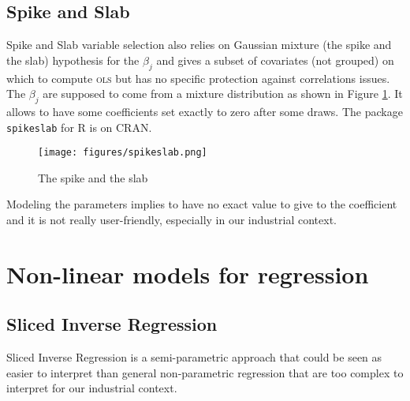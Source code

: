\documentclass[12pt,a4paper]{report}
\begin{document}
		\subsection{Spike and Slab}			%

			Spike and Slab variable selection \cite{ishwaran2005spike} also relies on Gaussian mixture (the spike and the slab) hypothesis for the $\beta_j$ and gives a subset of covariates (not grouped) on which to compute \textsc{ols} but has no specific protection against correlations issues.  The $\beta_j$ are supposed to come from a mixture distribution as shown in Figure \ref{spikeslab}. It allows to have some coefficients set exactly to zero after some draws. The package {\tt spikeslab} for R is on CRAN. \\
			
\begin{figure}[h!]
	\centering
	\texttt{[image: figures/spikeslab.png]} 
	\caption{The spike and the slab}\label{spikeslab}
\end{figure}		
		
		Modeling the parameters implies to have no exact value to give to the coefficient and it is not really user-friendly, especially in our industrial context. %
		
		\FloatBarrier
	
		
		
		
		\section{Non-linear models for regression}	
			
	\subsection{Sliced Inverse Regression}
		Sliced Inverse Regression is a semi-parametric approach that could be seen as easier to interpret than general non-parametric regression \cite{eubank1999nonparametric,hardle1990applied} that are too complex to interpret for our industrial context. \\
		
\end{document}
